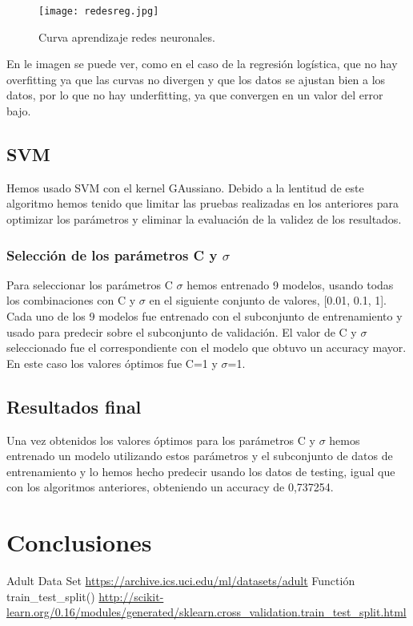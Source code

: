 \documentclass[11pt,spanish]{article}
\begin{document}
\begin{figure}[H]
  \centering
  \texttt{[image: redesreg.jpg]}
  \caption{Curva aprendizaje redes neuronales.}
\end{figure}

En le imagen se puede ver, como en el caso de la regresión logística, que no hay overfitting ya que las curvas no divergen y que los datos se ajustan bien a los datos, por lo que no hay underfitting, ya que convergen en un valor del error bajo.

\subsection{SVM}
Hemos usado SVM con el kernel GAussiano. Debido a la lentitud de este algoritmo hemos tenido que limitar las pruebas realizadas en los anteriores para optimizar los parámetros y eliminar la evaluación de la validez de los resultados.

\subsubsection{Selección de los parámetros C y $\sigma$}
Para seleccionar los parámetros C $\sigma$ hemos entrenado 9 modelos, usando todas los combinaciones con C y $\sigma$ en el siguiente conjunto de valores, [0.01, 0.1, 1]. Cada uno de los 9 modelos fue entrenado con el subconjunto de entrenamiento y usado para predecir sobre el subconjunto de validación. El valor de C y $\sigma$ seleccionado fue el correspondiente con el modelo que obtuvo un accuracy mayor. En este caso los valores óptimos fue C=1 y $\sigma$=1.

\subsection{Resultados final}
Una vez obtenidos los valores óptimos para los parámetros C y $\sigma$ hemos entrenado un modelo utilizando estos parámetros y el subconjunto de datos de entrenamiento y lo hemos hecho predecir usando los datos de testing, igual que con los algoritmos anteriores, obteniendo un accuracy de 0,737254.

\section{Conclusiones}

\begin{thebibliography}{15}
	 Adult Data Set \url{https://archive.ics.uci.edu/ml/datasets/adult}
     Functión train\_test\_split() 
    	\url{http://scikit-learn.org/0.16/modules/generated/sklearn.cross_validation.train_test_split.html}
\end{thebibliography}
\end{document}
